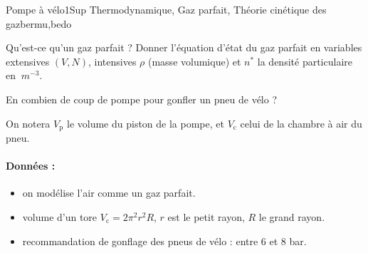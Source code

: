 

\begin{exercise}{Pompe à vélo}{1}{Sup}
{Thermodynamique, Gaz parfait, Théorie cinétique des gaz}{bermu,bedo}

\begin{questions}
    \questioncours Qu'est-ce qu'un gaz parfait ? Donner l'équation d'état du gaz parfait en variables extensives $(V,N)$, intensives $\rho$ (masse volumique) et $n^\ast$ la densité particulaire en $\SI{}{m^{-3}}$.
    
    \question En combien de coup de pompe pour gonfler un pneu de vélo ?
    
    On notera $V_\text{p}$ le volume du piston de la pompe, et $V_\text{c}$ celui de la chambre à air du pneu.

\end{questions}

\paragraph{Données :}
\begin{itemize}
    \item on modélise l'air comme un gaz parfait.
    \item volume d'un tore $V_\text{c} = 2\pi^2 r^2 R$, $r$ est le petit rayon, $R$ le grand rayon.
    \item recommandation de gonflage des pneus de vélo : entre 6 et 8 bar.
\end{itemize}

\end{exercise}

